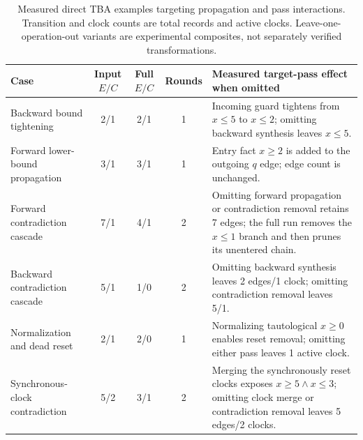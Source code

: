 \begin{table}[tp]
\centering
\caption{Measured direct TBA examples targeting propagation and pass interactions. Transition and clock counts are total records and active clocks. Leave-one-operation-out variants are experimental composites, not separately verified transformations.}
\label{tab:synthetic-interactions}
\scriptsize
\setlength{\tabcolsep}{3pt}
\begin{tabular}{@{}p{}cccp{}@{}}
\toprule
Case & Input $E/C$ & Full $E/C$ & Rounds & Measured target-pass effect when omitted\\
\midrule
Backward bound tightening & 2/1 & 2/1 & 1 & Incoming guard tightens from $x\leq5$ to $x\leq2$; omitting backward synthesis leaves $x\leq5$.\\
Forward lower-bound propagation & 3/1 & 3/1 & 1 & Entry fact $x\geq2$ is added to the outgoing $q$ edge; edge count is unchanged.\\
Forward contradiction cascade & 7/1 & 4/1 & 2 & Omitting forward propagation or contradiction removal retains 7 edges; the full run removes the $x\leq1$ branch and then prunes its unentered chain.\\
Backward contradiction cascade & 5/1 & 1/0 & 2 & Omitting backward synthesis leaves 2 edges/1 clock; omitting contradiction removal leaves 5/1.\\
Normalization and dead reset & 2/1 & 2/0 & 1 & Normalizing tautological $x\geq0$ enables reset removal; omitting either pass leaves 1 active clock.\\
Synchronous-clock contradiction & 5/2 & 3/1 & 2 & Merging the synchronously reset clocks exposes $x\geq5\land x\leq3$; omitting clock merge or contradiction removal leaves 5 edges/2 clocks.\\
\bottomrule
\end{tabular}
\end{table}
